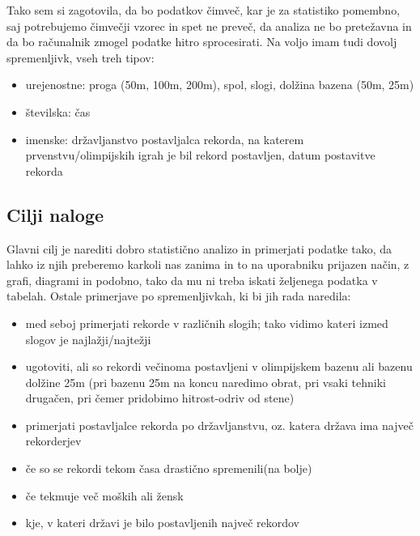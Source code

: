 \documentclass[10pt]{article}
\begin{document}
Tako sem si zagotovila, da bo podatkov čimveč, kar je za statistiko pomembno, saj potrebujemo čimvečji vzorec in spet ne preveč, da analiza ne bo pretežavna in da bo računalnik zmogel podatke hitro sprocesirati. Na voljo imam tudi dovolj spremenljivk, vseh treh tipov:
\begin{itemize}
\item urejenostne: proga (50m, 100m, 200m), spol, slogi, dolžina bazena (50m, 25m)
\item številska: čas
\item imenske: državljanstvo postavljalca rekorda, na katerem prvenstvu/olimpijskih igrah je bil rekord postavljen, datum postavitve rekorda
\end{itemize}

\subsection{Cilji naloge}


Glavni cilj je narediti dobro statistično analizo in primerjati podatke tako, da lahko iz njih preberemo karkoli nas zanima in to na uporabniku prijazen način, z grafi, diagrami in podobno, tako da mu ni treba iskati željenega podatka v tabelah. Ostale primerjave po spremenljivkah, ki bi jih rada naredila:
\begin{itemize}
\item med seboj primerjati rekorde v različnih slogih; tako vidimo kateri izmed slogov je najlažji/najtežji
\item ugotoviti, ali so rekordi večinoma postavljeni v olimpijskem bazenu ali bazenu dolžine 25m (pri bazenu 25m na koncu naredimo obrat, pri vsaki tehniki drugačen, pri čemer pridobimo hitrost-odriv od stene)
\item primerjati postavljalce rekorda po državljanstvu, oz. katera država ima največ rekorderjev
\item če so se rekordi tekom časa drastično spremenili(na bolje)
\item če tekmuje več moških ali žensk
\item kje, v kateri državi je bilo postavljenih največ rekordov
\end{itemize}
\end{document}
